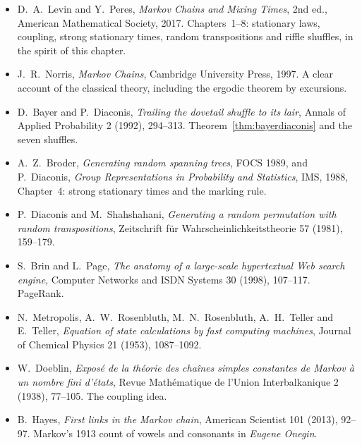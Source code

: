 \begin{itemize}
\item D.~A.~Levin and Y.~Peres, \emph{Markov Chains and Mixing Times}, 2nd ed., American Mathematical Society, 2017.
Chapters~1--8: stationary laws, coupling, strong stationary times, random transpositions and riffle shuffles, in the
spirit of this chapter.
\item J.~R.~Norris, \emph{Markov Chains}, Cambridge University Press, 1997. A clear account of the classical theory,
including the ergodic theorem by excursions.
\item D.~Bayer and P.~Diaconis, \emph{Trailing the dovetail shuffle to its lair}, Annals of Applied Probability 2 (1992),
294--313. Theorem~\ref{thm:bayerdiaconis} and the seven shuffles.
\item A.~Z.~Broder, \emph{Generating random spanning trees}, FOCS 1989, and P.~Diaconis, \emph{Group Representations in
Probability and Statistics}, IMS, 1988, Chapter~4: strong stationary times and the marking rule.
\item P.~Diaconis and M.~Shahshahani, \emph{Generating a random permutation with random transpositions}, Zeitschrift
für Wahrscheinlichkeitstheorie 57 (1981), 159--179.
\item S.~Brin and L.~Page, \emph{The anatomy of a large-scale hypertextual Web search engine}, Computer Networks and ISDN
Systems 30 (1998), 107--117. PageRank.
\item N.~Metropolis, A.~W.~Rosenbluth, M.~N.~Rosenbluth, A.~H.~Teller and E.~Teller, \emph{Equation of state calculations by
fast computing machines}, Journal of Chemical Physics 21 (1953), 1087--1092.
\item W.~Doeblin, \emph{Exposé de la théorie des chaînes simples constantes de Markov à un nombre fini d'états}, Revue
Mathématique de l'Union Interbalkanique 2 (1938), 77--105. The coupling idea.
\item B.~Hayes, \emph{First links in the Markov chain}, American Scientist 101 (2013), 92--97. Markov's 1913 count of vowels and consonants in \emph{Eugene Onegin}.
\end{itemize}
